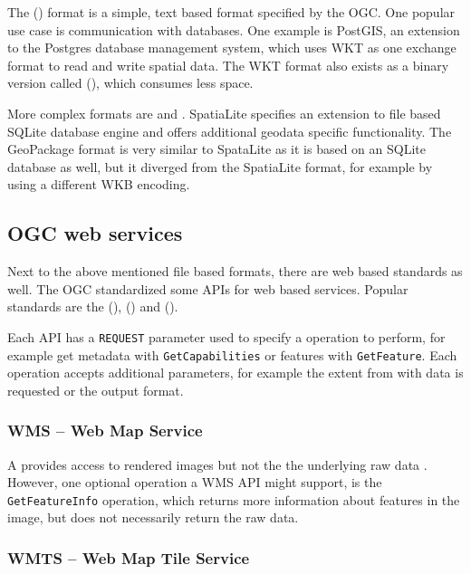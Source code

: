 			The  () format is a simple, text based format specified by the OGC\cite[51]{ogc-sfa}.
			One popular use case is communication with databases.
			One example is PostGIS, an extension to the Postgres database management system, which uses WKT as one exchange format to read and write spatial data\cite{postgis-doc-wkt}.
			The WKT format also exists as a binary version called  (), which consumes less space.
			
			More complex formats are  and .
			SpatiaLite specifies an extension to file based SQLite database engine and offers additional geodata specific functionality\cite{spatialite-website}.
			The GeoPackage format is very similar to SpataLite as it is based on an SQLite database as well, but it diverged from the SpatiaLite format, for example by using a different WKB encoding\cite{geopackage-faq}.
			
	\subsection{OGC web services}
	
		Next to the above mentioned file based formats, there are web based standards as well.
		The OGC standardized some APIs for web based services.
		Popular standards are the  (),  () and  ().
		
		Each API has a \texttt{REQUEST} parameter used to specify a operation to perform, for example get metadata with \texttt{GetCapabilities} or features with \texttt{GetFeature}.
		Each operation accepts additional parameters, for example the extent from with data is requested or the output format.
		
		\subsubsection{WMS -- Web Map Service}
		
			A  provides access to rendered images but not the the underlying raw data \cite{ogc-wms}.
			However, one optional operation a WMS API might support, is the \texttt{GetFeatureInfo} operation, which returns more information about features in the image, but does not necessarily return the raw data.
		
		\subsubsection{WMTS -- Web Map Tile Service}
		

